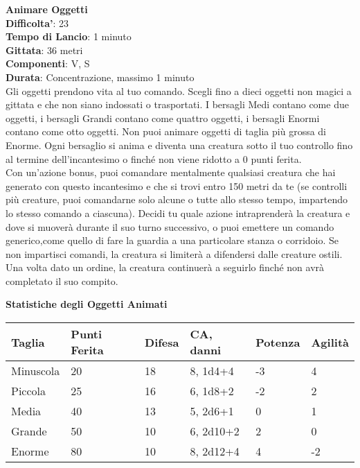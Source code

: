 \begin{multicols}{2}
\medskip\textbf{Animare Oggetti}\\
\textbf{Difficolta'}: 23\\
\textbf{Tempo di Lancio}: 1 minuto\\
\textbf{Gittata}: 36 metri\\
\textbf{Componenti}: V, S\\
\textbf{Durata}: Concentrazione, massimo 1 minuto\\
Gli oggetti prendono vita al tuo comando. Scegli fino a dieci oggetti non magici a gittata e che non siano indossati o trasportati. I bersagli Medi contano come due oggetti, i bersagli Grandi contano come quattro oggetti, i bersagli Enormi contano come otto oggetti. Non puoi animare oggetti di taglia più grossa di Enorme. Ogni bersaglio si anima e diventa una creatura sotto il tuo controllo fino al termine dell’incantesimo o finché non viene ridotto a 0 punti ferita.\\
Con un’azione bonus, puoi comandare mentalmente qualsiasi creatura che hai generato con questo incantesimo e che si trovi entro 150 metri da te (se controlli più creature, puoi comandarne solo alcune o tutte allo stesso tempo, impartendo lo stesso comando a ciascuna). Decidi tu quale azione intraprenderà la creatura e dove si muoverà durante il suo turno successivo, o puoi emettere un comando generico,come quello di fare la guardia a una particolare stanza o corridoio. Se non impartisci comandi, la creatura si limiterà a difendersi dalle creature ostili. Una volta dato un ordine, la creatura continuerà a seguirlo finché non avrà completato il suo compito.
\bigskip

\end{multicols}

\textbf{Statistiche degli Oggetti Animati}
\bigskip

\begin{tabular}{llllll}
Taglia		&Punti Ferita	&Difesa	&CA, danni					&Potenza	&Agilità\\ 
\toprule
Minuscola 	&20 			&18		&8, {1d4+4} 	&-3 		&4\\
Piccola 	&25 			&16 	&6, {1d8+2} 	&-2 		&2\\
Media 		&40 			&13 	&5, {2d6+1} 	&0 			&1\\
Grande 		&50 			&10 	&6, {2d10+2}	&2 			&0\\
Enorme 		&80 			&10 	&8, {2d12+4}	&4 			&-2\\
\end{tabular}

\bigskip

